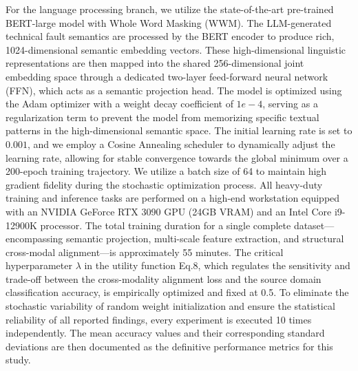 \documentclass[journal]{IEEEtran}
\begin{document}
For the language processing branch, we utilize the state-of-the-art pre-trained BERT-large model with Whole Word Masking (WWM). The LLM-generated technical fault semantics are processed by the BERT encoder to produce rich, 1024-dimensional semantic embedding vectors. These high-dimensional linguistic representations are then mapped into the shared 256-dimensional joint embedding space through a dedicated two-layer feed-forward neural network (FFN), which acts as a semantic projection head. The model is optimized using the Adam optimizer with a weight decay coefficient of $1e-4$, serving as a regularization term to prevent the model from memorizing specific textual patterns in the high-dimensional semantic space. The initial learning rate is set to $0.001$, and we employ a Cosine Annealing scheduler to dynamically adjust the learning rate, allowing for stable convergence towards the global minimum over a 200-epoch training trajectory. We utilize a batch size of 64 to maintain high gradient fidelity during the stochastic optimization process. All heavy-duty training and inference tasks are performed on a high-end workstation equipped with an NVIDIA GeForce RTX 3090 GPU (24GB VRAM) and an Intel Core i9-12900K processor. The total training duration for a single complete dataset—encompassing semantic projection, multi-scale feature extraction, and structural cross-modal alignment—is approximately 55 minutes. The critical hyperparameter $\lambda$ in the utility function Eq.8, which regulates the sensitivity and trade-off between the cross-modality alignment loss and the source domain classification accuracy, is empirically optimized and fixed at 0.5. To eliminate the stochastic variability of random weight initialization and ensure the statistical reliability of all reported findings, every experiment is executed 10 times independently. The mean accuracy values and their corresponding standard deviations are then documented as the definitive performance metrics for this study.
\end{document}
